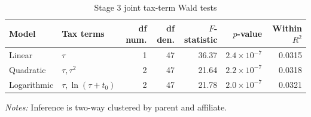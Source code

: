 \begin{table}[H]
\centering
\footnotesize
\setlength{\tabcolsep}{3pt}
\caption{Stage 3 joint tax-term Wald tests}
\label{tab:app_stage3_wald_tests}
\begin{tabular}{@{}llrrrrr@{}}
\toprule
Model & Tax terms & df num. & df den. & $F$-statistic & $p$-value & Within $R^2$ \\
\midrule
Linear & $\tau$ & 1 & 47 & 36.37 & $2.4 \times 10^{-7}$ & 0.0315 \\
Quadratic & $\tau, \tau^2$ & 2 & 47 & 21.64 & $2.2 \times 10^{-7}$ & 0.0318 \\
Logarithmic & $\tau, \ln(\tau+t_0)$ & 2 & 47 & 21.78 & $2.0 \times 10^{-7}$ & 0.0321 \\
\bottomrule
\end{tabular}

\vspace{0.35em}
\noindent\begin{minipage}{\textwidth}
\footnotesize\raggedright\textit{Notes:} Inference is two-way clustered by parent and affiliate.
\end{minipage}
\end{table}
